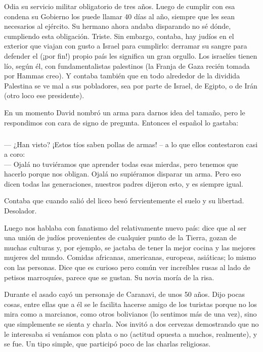 Odia su servicio militar obligatorio de tres años. Luego de cumplir con esa
condena su Gobierno los puede llamar 40 días al año, siempre que les sean
necesarios al ejército. Su hermano ahora andaba disparando no sé dónde,
cumpliendo esta obligación. Triste. Sin embargo, contaba, hay judíos en el
exterior que viajan con gusto a Israel para cumplirlo: derramar su sangre para
defender el (¡por fin!) propio país les significa un gran
orgullo. Los israelíes tienen lío, según él, con fundamentalistas palestinos
(la Franja de Gaza recién tomada por Hammas creo). Y contaba también que en
todo alrededor de la dividida Palestina se ve mal a sus pobladores, sea por
parte de Israel, de Egipto, o de Irán (otro loco ese presidente).

En un momento David nombró un arma para darnos idea del tamaño, pero le
respondimos con cara de signo de pregunta. Entonces el español lo gastaba:

\subparagraph{}\label{ssub:israelies} --- ¿Han visto?
¡Estos tíos saben pollas de armas! -- a lo que ellos contestaron
casi a coro:\\ --- Ojalá no tuviéramos que aprender todas esas mierdas, pero
tenemos que hacerlo porque nos obligan. Ojalá no supiéramos disparar un arma.
Pero eso dicen todas las generaciones, nuestros padres dijeron esto, y es
siempre igual.\\ \hangindent=1cm

Contaba que cuando salió del liceo besó fervientemente el suelo y su libertad.
Desolador.

Luego nos hablaba con fanatismo del relativamente nuevo país: dice que al ser
una unión de judíos provenientes de cualquier punto de la Tierra, gozan de
muchas culturas y, por ejemplo, se jactaba de tener la mejor cocina y las
mejores mujeres del mundo. Comidas africanas, americanas, europeas, asiáticas;
lo mismo con las personas. Dice que es curioso pero común ver increíbles rusas
al lado de petisos marroquíes, parece que se gustan. Su novia moría de la
risa.

Durante el asado cayó un personaje de Caranavi, de unos 50 años. Dijo pocas
cosas, entre ellas que a él se le facilita hacerse amigo de los turistas porque
no los mira como a marcianos, como otros bolivianos (lo sentimos más de una
vez), sino que simplemente se sienta y charla. Nos invitó a dos cervezas
demostrando que no le interesaba si veníamos con plata o no (actitud opuesta a
muchos, realmente), y se fue. Un tipo simple, que participó poco de las charlas
religiosas.

